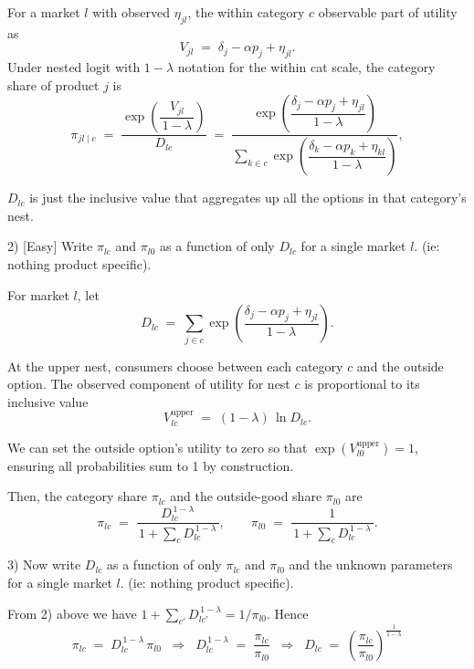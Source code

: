 \documentclass{article}
\begin{document}
For a market $l$ with observed $\eta_{jl}$, the within category $c$ observable part of utility as
\[
V_{jl} \;=\; \delta_j - \alpha p_j + \eta_{jl}.
\]
Under nested logit with $1-\lambda$ notation for the within cat scale, the category share of product $j$ is
\[
\pi_{jl\mid c}
\;=\;
\frac{\exp\!\left(\dfrac{V_{jl}}{\,1-\lambda\,}\right)}{D_{lc}}
\;=\;
\frac{\exp\!\left(\dfrac{\delta_j - \alpha p_j + \eta_{jl}}{\,1-\lambda\,}\right)}%
{\displaystyle \sum_{k\in c}\exp\!\left(\dfrac{\delta_k - \alpha p_k + \eta_{kl}}{\,1-\lambda\,}\right)},
\]

$D_{lc}$ is just the inclusive value that aggregates up all the options in that category's nest.


\begin{tcolorbox}
2) [Easy]  Write $\pi_{lc}$ and $\pi_{l0}$ as a function of only $D_{lc}$ for a single market $l$.  (ie: nothing product specific).
\end{tcolorbox}

For market $l$, let
\[
D_{lc} \;=\; \sum_{j\in c} \exp\!\left(\frac{\delta_j-\alpha p_j+\eta_{jl}}{1-\lambda}\right).
\]

At the upper nest, consumers choose between each category $c$ and the outside option.  
The observed component of utility for nest $c$ is proportional to its inclusive value
\[
V_{lc}^{\text{upper}} \;=\; (1-\lambda)\,\ln D_{lc}.
\]

We can set the outside option’s utility to zero so that $\exp(V_{l0}^{\text{upper}}) = 1$, ensuring all probabilities sum to 1 by construction.

Then, the category share $\pi_{lc}$ and the outside-good share $\pi_{l0}$ are
\[
\pi_{lc}
\;=\;
\frac{D_{lc}^{\,1-\lambda}}{\,1+\sum_{c} D_{lc}^{\,1-\lambda}\,}, 
\qquad
\pi_{l0}
\;=\;
\frac{1}{\,1+\sum_{c} D_{lc}^{\,1-\lambda}\,}.
\]



\begin{tcolorbox}
3) Now write $D_{lc}$ as a function of only $\pi_{lc}$ and $\pi_{l0}$ and the unknown parameters for a single market $l$. (ie: nothing product specific).
\end{tcolorbox}

From 2) above we have \(1+\sum_{c'} D_{lc'}^{\,1-\lambda}=1/\pi_{l0}\). Hence
\[
\pi_{lc} \;=\; D_{lc}^{\,1-\lambda}\,\pi_{l0}
\;\;\Rightarrow\;\;
D_{lc}^{\,1-\lambda} \;=\; \frac{\pi_{lc}}{\pi_{l0}}
\;\;\Rightarrow\;\;
D_{lc} \;=\; \left(\frac{\pi_{lc}}{\pi_{l0}}\right)^{\!\frac{1}{1-\lambda}}
\]
\end{document}

